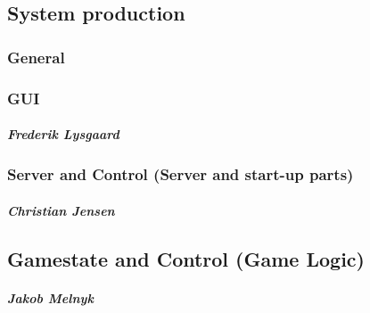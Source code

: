 \subsection{System production}
\subsubsection{General}

\subsubsection{GUI}
\subparagraph{Frederik Lysgaard}

\subsubsection{Server and Control (Server and start-up parts)}
\subparagraph{Christian Jensen}

\subsection{Gamestate and Control (Game Logic)}
\subparagraph{Jakob Melnyk}
